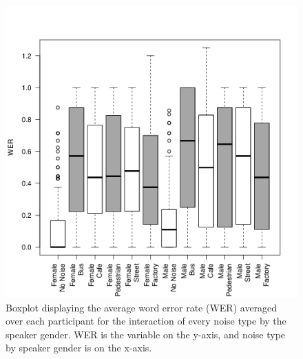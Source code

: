 \documentclass[dissertation,copyright]{uathesis}
\makeatletter
\def\maxwidth{ %
  \ifdim\Gin@nat@width>\linewidth
    \linewidth
  \else
    \Gin@nat@width
  \fi
}
\makeatother
\begin{document}
\begin{figure}[h!]

\includegraphics[width=\maxwidth]{figure/boxplot_noiseXspkr-1} 

\caption{Boxplot displaying the average word error rate (WER) averaged over each participant for the interaction of every noise type by the speaker gender. WER is the variable on the y-axis, and noise type by speaker gender is on the x-axis.}
\label{fig:anova1_noiseXspkr_boxplot}
\end{figure}
\end{document}
